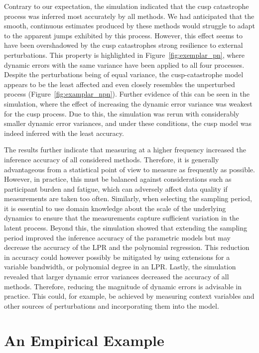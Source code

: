 \documentclass[man, floatsintext]{apa7}
\begin{document}
Contrary to our expectation, the simulation indicated that the cusp
catastrophe process was inferred most accurately by all methods. We
had anticipated that the smooth, continuous estimates produced by these methods
would struggle to adapt to the apparent jumps exhibited by this process.
However, this effect seems to have been overshadowed by the cusp catastrophes
strong resilience to external perturbations. This property is highlighted in
Figure~\ref{fig:exemplar_pn}, where dynamic errors with the same variance have
been applied to all four processes. Despite the perturbations being of equal
variance, the cusp-catastrophe model appears to be the least affected and even
closely resembles the unperturbed process (Figure~\ref{fig:examplar_npn}).
Further evidence of this can be seen in the simulation, where the effect of
increasing the dynamic error variance was weakest for the cusp process. Due to
this, the simulation was rerun with considerably smaller dynamic error
variances, and under these conditions, the cusp model was indeed inferred with
the least accuracy.

The results further indicate that measuring at a higher frequency increased the
inference accuracy of all considered methods. Therefore, it is generally
advantageous from a statistical point of view to measure as frequently as
possible. However, in practice, this must be balanced against considerations
such as participant burden and fatigue, which can adversely affect data quality
if measurements are taken too often. Similarly, when selecting the sampling
period, it is essential to use domain knowledge about the scale of the
underlying dynamics to ensure that the measurements capture sufficient
variation in the latent process. Beyond this, the simulation showed that
extending the sampling period improved the inference accuracy of the parametric
models but may decrease the accuracy of the LPR and the polynomial
regression\@. This reduction in accuracy could however possibly be mitigated by
using extensions for a variable bandwidth, or polynomial degree in an LPR\@.
Lastly, the simulation revealed that larger dynamic error variances decreased
the accuracy of all methods. Therefore, reducing the magnitude of dynamic
errors is advisable in practice. This could, for example, be achieved by
measuring context variables and other sources of perturbations and
incorporating them into the model.

\section{An Empirical Example} \label{empirical_example}
\end{document}
